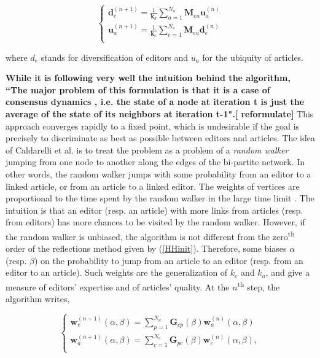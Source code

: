 \begin{equation}
\begin{cases}
 \mathbf{d}_{e}^{(n+1)} = \frac{1}{\mathbf{k}_a} \sum_{a=1}^{N_{a}} \mathbf{M}_{ea} \mathbf{u}_{a}^{(n)}\\
 \mathbf{u}_{a}^{(n+1)} = \frac{1}{\mathbf{k}_e}\sum_{e=1}^{N_{e}} \mathbf{M}_{ea} \mathbf{d}_{e}^{(n)}\\
\end{cases}
\label{HHalgo}
\end{equation}

where $d_{e}$ stands for diversification of editors and $u_{a}$ for the ubiquity of articles.

{\bf While it is following very well the intuition behind the algorithm, ``The major problem of this formulation is that it is a case of consensus dynamics \cite{shamma2007cooperative}, i.e. the state of a node at iteration t is just the average of the state of its neighbors at iteration t-1".[ reformulate] } This approach converges rapidly to a fixed point, which is undesirable if the goal is precisely to discriminate as best as possible between editors and articles. The idea of Caldarelli et al. \cite{caldarelli2012network} is to treat the problem as a problem of a {\it random walker} jumping from one node to another along the edges of the bi-partite network. In other words, the random walker jumps with some probability from an editor to a linked article, or from an article to a linked editor. The weights of vertices are proportional to the time spent by the random walker in the large time limit \cite{zlatic2010}.  The intuition is that an editor (resp. an article) with more links from articles (resp. from editors) has more chances to be visited by the random walker. However, if the random walker is unbiased, the algorithm is not different from the zero\textsuperscript{th} order of the reflections method given by (\ref{HHinit}). Therefore, some biases $\alpha$ (resp. $\beta$) on the probability to jump from an article to an editor (resp. from an editor to an article). Such weights are the generalization of $k_e$ and $k_a$, and give a measure of editors' expertise and of articles' quality. At the $n$\textsuperscript{th} step, the algorithm writes,

\begin{equation}
\begin{cases}
 \mathbf{w}^{(n+1)}_e (\alpha,\beta) = \sum_{p=1}^{N_a}  \mathbf{G}_{cp}(\beta) \mathbf{w}^{(n)}_a (\alpha,\beta)\\
\mathbf{w}^{(n+1)}_a (\alpha,\beta) = \sum_{c=1}^{N_e}  \mathbf{G}_{pc}(\beta) \mathbf{w}^{(n)}_e (\alpha,\beta),\\
\end{cases}
\end{equation}

